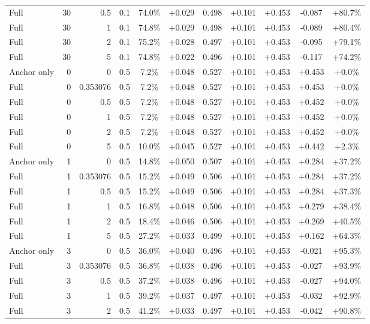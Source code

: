\begin{table}[htbp]
\begin{tabular}{lrrrccccccc}
Full & 30 & 0.5 & 0.1 & 74.0\% & +0.029 & 0.498 & +0.101 & +0.453 & -0.087 & +80.7\% \\
Full & 30 & 1 & 0.1 & 74.8\% & +0.029 & 0.498 & +0.101 & +0.453 & -0.089 & +80.4\% \\
Full & 30 & 2 & 0.1 & 75.2\% & +0.028 & 0.497 & +0.101 & +0.453 & -0.095 & +79.1\% \\
Full & 30 & 5 & 0.1 & 74.8\% & +0.022 & 0.496 & +0.101 & +0.453 & -0.117 & +74.2\% \\
Anchor only & 0 & 0 & 0.5 & 7.2\% & +0.048 & 0.527 & +0.101 & +0.453 & +0.453 & +0.0\% \\
Full & 0 & 0.353076 & 0.5 & 7.2\% & +0.048 & 0.527 & +0.101 & +0.453 & +0.453 & +0.0\% \\
Full & 0 & 0.5 & 0.5 & 7.2\% & +0.048 & 0.527 & +0.101 & +0.453 & +0.452 & +0.0\% \\
Full & 0 & 1 & 0.5 & 7.2\% & +0.048 & 0.527 & +0.101 & +0.453 & +0.452 & +0.0\% \\
Full & 0 & 2 & 0.5 & 7.2\% & +0.048 & 0.527 & +0.101 & +0.453 & +0.452 & +0.0\% \\
Full & 0 & 5 & 0.5 & 10.0\% & +0.045 & 0.527 & +0.101 & +0.453 & +0.442 & +2.3\% \\
Anchor only & 1 & 0 & 0.5 & 14.8\% & +0.050 & 0.507 & +0.101 & +0.453 & +0.284 & +37.2\% \\
Full & 1 & 0.353076 & 0.5 & 15.2\% & +0.049 & 0.506 & +0.101 & +0.453 & +0.284 & +37.2\% \\
Full & 1 & 0.5 & 0.5 & 15.2\% & +0.049 & 0.506 & +0.101 & +0.453 & +0.284 & +37.3\% \\
Full & 1 & 1 & 0.5 & 16.8\% & +0.048 & 0.506 & +0.101 & +0.453 & +0.279 & +38.4\% \\
Full & 1 & 2 & 0.5 & 18.4\% & +0.046 & 0.506 & +0.101 & +0.453 & +0.269 & +40.5\% \\
Full & 1 & 5 & 0.5 & 27.2\% & +0.033 & 0.499 & +0.101 & +0.453 & +0.162 & +64.3\% \\
Anchor only & 3 & 0 & 0.5 & 36.0\% & +0.040 & 0.496 & +0.101 & +0.453 & -0.021 & +95.3\% \\
Full & 3 & 0.353076 & 0.5 & 36.8\% & +0.038 & 0.496 & +0.101 & +0.453 & -0.027 & +93.9\% \\
Full & 3 & 0.5 & 0.5 & 37.2\% & +0.038 & 0.496 & +0.101 & +0.453 & -0.027 & +94.0\% \\
Full & 3 & 1 & 0.5 & 39.2\% & +0.037 & 0.497 & +0.101 & +0.453 & -0.032 & +92.9\% \\
Full & 3 & 2 & 0.5 & 41.2\% & +0.033 & 0.497 & +0.101 & +0.453 & -0.042 & +90.8\% \\

\end{tabular}
\end{table}
